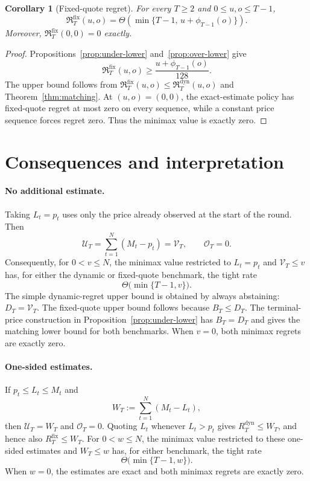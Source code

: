 \documentclass[11pt]{article}
\newtheorem{corollary}[theorem]{Corollary}
\theoremstyle{remark}
\newcommand{\cU}{\mathcal U}
\newcommand{\cO}{\mathcal O}
\newcommand{\cV}{\mathcal V}
\newcommand{\Rstar}{\mathfrak R}
\begin{document}
\begin{corollary}[Fixed-quote regret]\label{cor:fixed}
For every $T\ge2$ and $0\le u,o\le T-1$,
\[
  \Rstar_T^{\mathrm{fix}}(u,o)
  =\Theta\!\left(
     \min\{T-1,\,u+\phi_{T-1}(o)\}
   \right).
\]
Moreover, $\Rstar_T^{\mathrm{fix}}(0,0)=0$ exactly.
\end{corollary}

\begin{proof}
Propositions~\ref{prop:under-lower} and~\ref{prop:over-lower} give
\[
  \Rstar_T^{\mathrm{fix}}(u,o)
  \ge \frac{u+\phi_{T-1}(o)}{128}.
\]
The upper bound follows from
$\Rstar_T^{\mathrm{fix}}(u,o)\le\Rstar_T^{\mathrm{dyn}}(u,o)$ and
Theorem~\ref{thm:matching}.  At $(u,o)=(0,0)$, the exact-estimate policy has
fixed-quote regret at most zero on every sequence, while a constant price
sequence forces regret zero.  Thus the minimax value is exactly zero.
\end{proof}

\section{Consequences and interpretation}

\paragraph{No additional estimate.}
Taking $L_t=p_t$ uses only the price already observed at the start of the
round.  Then
\[
  \cU_T=\sum_{t=1}^{N}(M_t-p_t)=\cV_T,
  \qquad
  \cO_T=0.
\]
Consequently, for $0<v\le N$, the minimax value restricted to
$L_t=p_t$ and $\cV_T\le v$ has, for either the dynamic or fixed-quote
benchmark, the tight rate
\begin{equation}\label{eq:variation-corollary}
  \Theta\bigl(\min\{T-1,v\}\bigr).
\end{equation}
The simple dynamic-regret upper bound is obtained by always abstaining:
$D_T=\cV_T$.  The fixed-quote upper bound follows because $B_T\le D_T$.
The terminal-price construction in Proposition~\ref{prop:under-lower} has
$B_T=D_T$ and gives the matching lower bound for both benchmarks.
When $v=0$, both minimax regrets are exactly zero.

\paragraph{One-sided estimates.}
If $p_t\le L_t\le M_t$ and
\[
  W_T:=\sum_{t=1}^{N}(M_t-L_t),
\]
then $\cU_T=W_T$ and $\cO_T=0$.  Quoting $L_t$ whenever $L_t>p_t$ gives
$R_T^{\mathrm{dyn}}\le W_T$, and hence also
$R_T^{\mathrm{fix}}\le W_T$.  For $0<w\le N$, the minimax value
restricted to these one-sided estimates and $W_T\le w$ has, for either
benchmark, the tight rate
\[
  \Theta\bigl(\min\{T-1,w\}\bigr).
\]
When $w=0$, the estimates are exact and both minimax regrets are exactly
zero.
\end{document}
